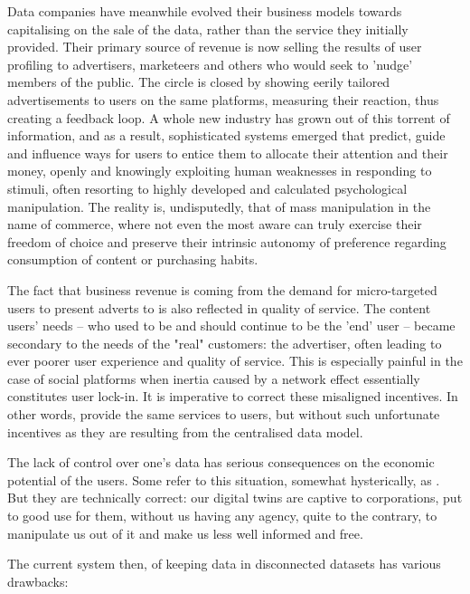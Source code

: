 Data companies have meanwhile evolved their business models towards capitalising on the sale of the data, rather than the service they initially provided. Their primary source of revenue is now selling the results of user profiling to advertisers, marketeers and others who would seek to 'nudge' members of the public. The circle is closed by showing eerily tailored advertisements to users on the same platforms, measuring their reaction, thus creating a feedback loop. A whole new industry has grown out of this torrent of information, and as a result, sophisticated systems emerged that predict, guide and influence ways for users to entice them to allocate their attention and their money, openly and knowingly exploiting human weaknesses in responding to stimuli, often resorting to highly developed and calculated psychological manipulation. The reality is, undisputedly, that of mass manipulation in the name of commerce, where not even the most aware can truly exercise their freedom of choice and preserve their intrinsic autonomy of preference regarding consumption of content or purchasing habits.

The fact that business revenue is coming from the demand for micro-targeted users to present adverts to is also reflected in quality of service. The content users' needs – who used to be and should continue to be the 'end' user – became secondary to the needs of the "real" customers: the advertiser, often leading to ever poorer user experience and quality of service. This is especially painful in the case of social platforms when  inertia caused by a network effect essentially constitutes user lock-in. It is imperative to correct these misaligned incentives. In other words, provide the same services to users, but without such unfortunate incentives as they are resulting from the centralised data model.

The lack of control over one's data has serious consequences on the economic potential of the users. Some refer to this situation, somewhat hysterically, as . But they are technically correct: our digital twins are  captive to corporations, put to good use for them, without us having any agency, quite to the contrary, to manipulate us out of it and make us less well informed and free. 

The current system then, of keeping data in disconnected datasets has various drawbacks: 

